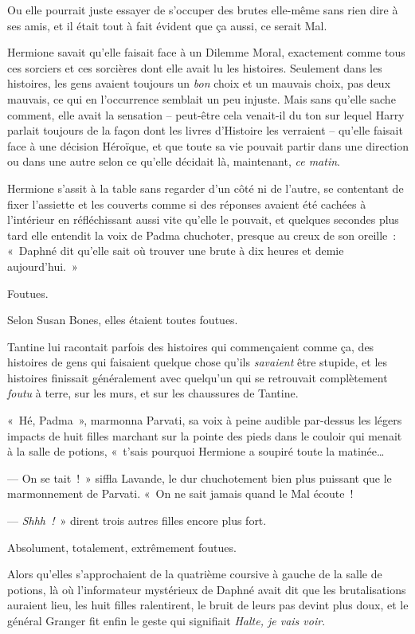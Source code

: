 Ou elle pourrait juste essayer de s'occuper des brutes elle-même sans rien dire à ses amis, et il était tout à fait évident que ça aussi, ce serait Mal.

Hermione savait qu'elle faisait face à un Dilemme Moral, exactement comme tous ces sorciers et ces sorcières dont elle avait lu les histoires. Seulement dans les histoires, les gens avaient toujours un \emph{bon} choix et un mauvais choix, pas deux mauvais, ce qui en l'occurrence semblait un peu injuste. Mais sans qu'elle sache comment, elle avait la sensation -- peut-être cela venait-il du ton sur lequel Harry parlait toujours de la façon dont les livres d'Histoire les verraient -- qu'elle faisait face à une décision Héroïque, et que toute sa vie pouvait partir dans une direction ou dans une autre selon ce qu'elle décidait là, maintenant, \emph{ce matin}.

Hermione s'assit à la table sans regarder d'un côté ni de l'autre, se contentant de fixer l'assiette et les couverts comme si des réponses avaient été cachées à l'intérieur en réfléchissant aussi vite qu'elle le pouvait, et quelques secondes plus tard elle entendit la voix de Padma chuchoter, presque au creux de son oreille~: «~Daphné dit qu'elle sait où trouver une brute à dix heures et demie aujourd'hui.~»

\later

Foutues.

Selon Susan Bones, elles étaient toutes foutues.

Tantine lui racontait parfois des histoires qui commençaient comme ça, des histoires de gens qui faisaient quelque chose qu'ils \emph{savaient} être stupide, et les histoires finissait généralement avec quelqu'un qui se retrouvait complètement \emph{foutu} à terre, sur les murs, et sur les chaussures de Tantine.

«~Hé, Padma~», marmonna Parvati, sa voix à peine audible par-dessus les légers impacts de huit filles marchant sur la pointe des pieds dans le couloir qui menait à la salle de potions, «~t'sais pourquoi Hermione a soupiré toute la matinée…

--- On se tait~!~» siffla Lavande, le dur chuchotement bien plus puissant que le marmonnement de Parvati. «~On ne sait jamais quand le Mal écoute~!

--- \emph{Shhh~!}~» dirent trois autres filles encore plus fort.

Absolument, totalement, extrêmement foutues.

Alors qu'elles s'approchaient de la quatrième coursive à gauche de la salle de potions, là où l'informateur mystérieux de Daphné avait dit que les brutalisations auraient lieu, les huit filles ralentirent, le bruit de leurs pas devint plus doux, et le général Granger fit enfin le geste qui signifiait \emph{Halte, je vais voir}.

